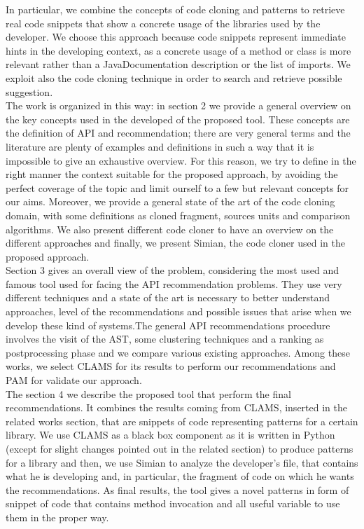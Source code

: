 	
In particular, we combine the concepts of code cloning and patterns to retrieve real code snippets that show a concrete usage of the libraries used by the developer. We choose this approach because code snippets represent immediate hints in the developing context, as a concrete usage of a method or class is more relevant rather than a JavaDocumentation description or the list of imports. We exploit also the code cloning technique in order to search and retrieve possible suggestion.\\
The work is organized in this way: in section 2 we provide a general overview on the key concepts used in the developed of the proposed tool. These concepts are the definition of API and recommendation; there are very general terms and the literature are plenty of examples and definitions in such a way that it is impossible to give an exhaustive overview. For this reason, we try to define in the right manner the context suitable for the proposed approach, by avoiding the perfect coverage of the topic and limit ourself to a few but relevant concepts for our aims. Moreover, we provide a general state of the art of the code cloning domain, with some definitions as cloned fragment, sources units and comparison algorithms. We also present different code cloner to have an overview on the different approaches and finally, we present Simian, the code cloner used in the proposed approach.\\
Section 3 gives an overall view of the problem, considering the most used and famous tool used for facing the API recommendation problems. They use very different techniques and a state of the art is necessary to better understand approaches, level of the recommendations and possible issues that arise when we develop these kind of systems.The general API recommendations procedure involves the visit of the AST, some clustering techniques and a ranking as postprocessing phase and we compare various existing approaches. Among these works, we select CLAMS for its results to perform our recommendations and PAM  for validate our approach. \\
The section 4 we describe the proposed tool that perform the final recommendations. It combines the results coming from CLAMS, inserted in the related works section, that are snippets of code representing patterns for a certain library. We use CLAMS as a black box component as it is written in Python (except for slight changes pointed out in the related section) to produce patterns for a library and then, we use Simian to analyze the developer's file, that contains what he is developing and, in particular, the fragment of code on which he wants the recommendations. As final results, the tool gives a novel patterns in form of snippet of code that contains method invocation and all useful variable to use them in the proper way.\\
